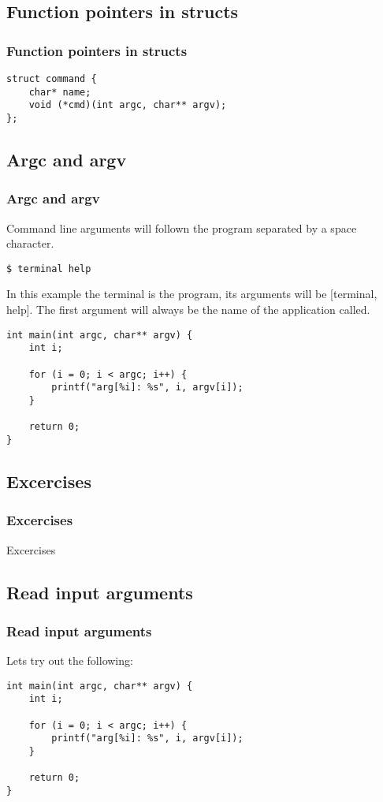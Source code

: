 \documentclass[
	11pt, %
]{beamer}
\newcommand{\sft}[1]{\section{#1}\frametitle{#1}\centering\LARGE#1}
\newcommand{\ssft}[1]{\subsection{#1}\frametitle{#1}}
\begin{document}
\begin{frame}[fragile]
    \ssft{Function pointers in structs}

    \begin{lstlisting}[style=CStyle]
struct command {
    char* name;
    void (*cmd)(int argc, char** argv);
};

\end{lstlisting}

\end{frame}

\begin{frame}[fragile]
    \ssft{Argc and argv}

    Command line arguments will follown the program separated by a space character.
    \begin{lstlisting}[style=CStyle]
$ terminal help

\end{lstlisting}
    In this example the terminal is the program, its arguments will be [terminal, help]. The first argument will always
    be the name of the application called.

    \bigskip

    \begin{lstlisting}[style=CStyle]
int main(int argc, char** argv) {
    int i;

    for (i = 0; i < argc; i++) {
        printf("arg[%i]: %s", i, argv[i]);
    }

    return 0;
}

\end{lstlisting}

\end{frame}


\begin{frame}
    \sft{Excercises}
\end{frame}

\begin{frame}[fragile]
    \ssft{Read input arguments}

    Lets try out the following:

    \begin{lstlisting}[style=CStyle]
int main(int argc, char** argv) {
    int i;

    for (i = 0; i < argc; i++) {
        printf("arg[%i]: %s", i, argv[i]);
    }

    return 0;
}

\end{lstlisting}

\end{frame}
\end{document}
